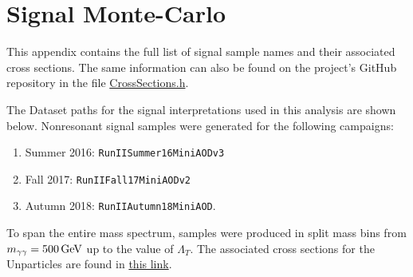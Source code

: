 \section{Signal Monte-Carlo}
\RaggedRight \parindent=25pt
\label{ch:appendix_signal_monte_carlo}
This appendix contains the full list of signal sample names and their associated cross sections. The same information can also be found on the project's GitHub repository in the file \href{https://github.com/cms-exotica-diphotons/diphoton-analysis/blob/dbd7b7b1ea7210aa55a27dcce8e84a3a5057d265/CommonClasses/interface/CrossSections.h}{CrossSections.h}.

The Dataset paths for the signal interpretations used in this analysis are shown below. Nonresonant signal samples were generated for the following campaigns:
\begin{enumerate}
    \item Summer 2016: \texttt{RunIISummer16Mini\-AODv3}
    \item Fall 2017: \texttt{RunIIFall17\-MiniAODv2}
    \item Autumn 2018: \texttt{RunIIAutumn18MiniAOD}.
\end{enumerate}
To span the entire mass spectrum, samples were produced in split mass bins from $m_{\gamma\gamma} = 500\,\text{Ge\hspace{-.08em}V}$ up to the value of $\Lambda_T$. The associated cross sections for the Unparticles are found in \href{https://github.com/cms-exotica-diphotons/diphoton-analysis/blob/Unparticles/CommonClasses/interface/CrossSections.h}{this link}.




